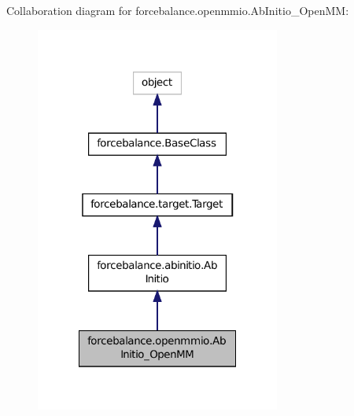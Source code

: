 Collaboration diagram for forcebalance.\-openmmio.\-Ab\-Initio\-\_\-\-Open\-M\-M\-:
\nopagebreak
\begin{figure}[H]
\begin{center}
\leavevmode
\includegraphics[width=228pt]{classforcebalance_1_1openmmio_1_1AbInitio__OpenMM__coll__graph}
\end{center}
\end{figure}
